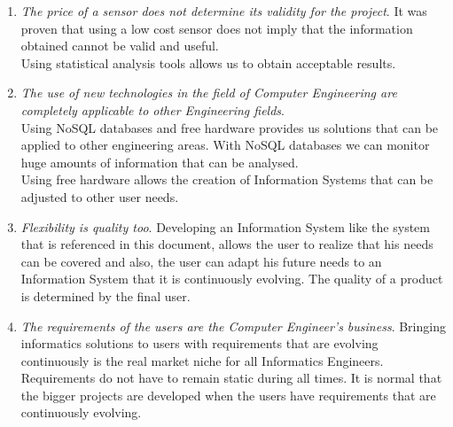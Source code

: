 \begin{enumerate}

\item \textit{The price of a sensor does not determine its validity for the project}. It was proven that using a low cost sensor does not imply that the information obtained cannot be valid and useful.\\

Using statistical analysis tools allows us to obtain acceptable results.

\item \textit{The use of new technologies in the field of Computer Engineering are completely applicable to other Engineering fields}.\\

Using NoSQL databases and free hardware provides us solutions that can be applied to other engineering areas. With NoSQL databases we can monitor huge amounts of information that can be analysed.\\

Using free hardware allows the creation of Information Systems that can be adjusted to other user needs.

\item \textit{Flexibility is quality too}. Developing an Information System like the system that is referenced in this document, allows the user to realize that his needs can be covered and also, the user can adapt his future needs to an Information System that it is continuously evolving. The quality of a product is determined by the final user.

\item \textit{The requirements of the users are the Computer Engineer's business}. Bringing informatics solutions to users with requirements that are evolving continuously is the real market niche for all Informatics Engineers. Requirements do not have to remain static during all times. It is normal that the bigger projects are developed when the users have requirements that are continuously evolving.

\end{enumerate}



